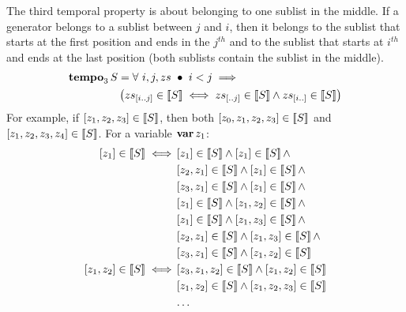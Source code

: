 %
%

The third temporal property is about belonging to one sublist in the middle.
If a generator belongs to a sublist between $j$ and $i$, then it belongs to the sublist that starts at the first position and ends in the $j^{th}$ and to the sublist that starts at $i^{th}$ and ends at the last position (both sublists contain the sublist in the middle).
%
\begin{align}
\tempo[3]{S} &= \forall~ i, j, zs ~\bullet~
i < j \implies \nonumber\\
&\left(
\slice{zs}{i}{j} \in \denote{S} \iff \sliceright{zs}{j} \in \denote{S} \land \sliceleft{zs}{i} \in \denote{S}
\right)\label{def:tempo3}
\end{align}
%
For example, if $\listsin{z_1,z_2,z_3} \in \denote{S}$, then both $\listsin{z_0,z_1,z_2,z_3} \in \denote{S}$ and $\listsin{z_1,z_2,z_3,z_4} \in \denote{S}$.
For a variable $\var{z_1}$:
%
%
\begin{align}
\listsin{z_1} \in \denote{S} \iff &
  \listsin{z_1} \in \denote{S} \land \listsin{z_1} \in \denote{S}\land\nonumber\\
  & \listsin{z_2,z_1} \in \denote{S} \land \listsin{z_1} \in \denote{S} \land\nonumber\\
  & \listsin{z_3,z_1} \in \denote{S} \land \listsin{z_1} \in \denote{S} \land\nonumber\\
  & \listsin{z_1} \in \denote{S} \land \listsin{z_1,z_2} \in \denote{S} \land\nonumber\\
  & \listsin{z_1} \in \denote{S} \land \listsin{z_1,z_3} \in \denote{S} \land\nonumber\\
  & \listsin{z_2,z_1} \in \denote{S} \land \listsin{z_1,z_3} \in \denote{S}\land\nonumber\\
  & \listsin{z_3,z_1} \in \denote{S} \land \listsin{z_1,z_2} \in \denote{S}\nonumber\\
\listsin{z_1,z_2} \in \denote{S} \iff &
  \listsin{z_3,z_1,z_2} \in \denote{S} \land \listsin{z_1,z_2} \in \denote{S}\nonumber\\
  & \listsin{z_1,z_2} \in \denote{S} \land \listsin{z_1,z_2,z_3} \in \denote{S}\nonumber\\
  & \ldots\nonumber
\end{align}

